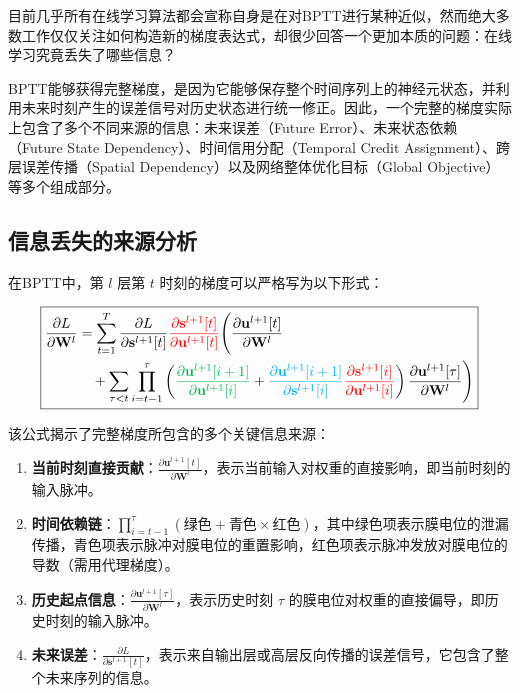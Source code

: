 \documentclass[journal,12pt,onecolumn]{IEEEtran}
\begin{document}
目前几乎所有在线学习算法都会宣称自身是在对BPTT进行某种近似，然而绝大多数工作仅仅关注如何构造新的梯度表达式，却很少回答一个更加本质的问题：在线学习究竟丢失了哪些信息？

BPTT能够获得完整梯度，是因为它能够保存整个时间序列上的神经元状态，并利用未来时刻产生的误差信号对历史状态进行统一修正。因此，一个完整的梯度实际上包含了多个不同来源的信息：未来误差（Future Error）、未来状态依赖（Future State Dependency）、时间信用分配（Temporal Credit Assignment）、跨层误差传播（Spatial Dependency）以及网络整体优化目标（Global Objective）等多个组成部分。

\subsection{信息丢失的来源分析}

在BPTT中，第 \(l\) 层第 \(t\) 时刻的梯度可以严格写为以下形式：

\begin{equation}
\boxed{
\begin{aligned}
\frac{\partial L}{\partial \mathbf{W}^l}
&=
\sum_{t=1}^T
\frac{\partial L}{\partial \mathbf{s}^{l+1}[t]}
{\color{red}{\frac{\partial \mathbf{s}^{l+1}[t]}{\partial \mathbf{u}^{l+1}[t]}}}
\Bigg(
\frac{\partial \mathbf{u}^{l+1}[t]}{\partial \mathbf{W}^l}
\\
&\quad+
\sum_{\tau < t}
\prod_{i=t-1}^{\tau}
\left(
{\color[rgb]{0,0.69,0.31}{\frac{\partial \mathbf{u}^{l+1}[i+1]}{\partial \mathbf{u}^{l+1}[i]}}}
+
{\color{cyan}{\frac{\partial \mathbf{u}^{l+1}[i+1]}{\partial \mathbf{s}^{l+1}[i]}}}
{\color{red}{\frac{\partial \mathbf{s}^{l+1}[i]}{\partial \mathbf{u}^{l+1}[i]}}}
\right)
\frac{\partial \mathbf{u}^{l+1}[\tau]}{\partial \mathbf{W}^l}
\Bigg)
\end{aligned}
}
\end{equation}

该公式揭示了完整梯度所包含的多个关键信息来源：

\begin{enumerate}
    \item \textbf{当前时刻直接贡献}：\(\frac{\partial \mathbf{u}^{l+1}[t]}{\partial \mathbf{W}^l}\)，表示当前输入对权重的直接影响，即当前时刻的输入脉冲。
    \item \textbf{时间依赖链}：\(\prod_{i=t-1}^{\tau} \left( \text{绿色} + \text{青色}\times\text{红色} \right)\)，其中绿色项表示膜电位的泄漏传播，青色项表示脉冲对膜电位的重置影响，红色项表示脉冲发放对膜电位的导数（需用代理梯度）。
    \item \textbf{历史起点信息}：\(\frac{\partial \mathbf{u}^{l+1}[\tau]}{\partial \mathbf{W}^l}\)，表示历史时刻 \(\tau\) 的膜电位对权重的直接偏导，即历史时刻的输入脉冲。
    \item \textbf{未来误差}：\(\frac{\partial L}{\partial \mathbf{s}^{l+1}[t]}\)，表示来自输出层或高层反向传播的误差信号，它包含了整个未来序列的信息。
\end{enumerate}
\end{document}
